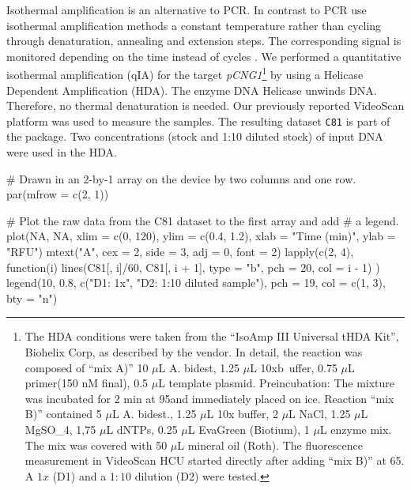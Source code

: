 Isothermal amplification is an alternative to PCR. In contrast to PCR use 
isothermal amplification methods a constant temperature rather than cycling 
through denaturation, annealing and extension steps. The corresponding signal is 
monitored depending on the time instead of cycles \citep{rodiger_nucleic_2014}. 
We performed a quantitative isothermal amplification (qIA) for the target 
\textit{pCNG1}\footnote{The HDA conditions were taken from the ``IsoAmp III 
Universal tHDA Kit'', Biohelix Corp, as described by the vendor. In detail, the 
reaction was composed of ``mix A)'' 10 $\mu$L A. bidest, 1.25 $\mu$L 10xb~uffer, 
0.75 $\mu$L primer(150 nM final), 0.5 $\mu$L template plasmid. Preincubation: 
The mixture was incubated for 2 min at 95\textcelsius and immediately placed on 
ice. Reaction ``mix B)'' contained 5 $\mu$L A. bidest., 1.25 $\mu$L 10x buffer, 
2 $\mu$L NaCl, 1.25 $\mu$L MgSO_{4}, 1,75 $\mu$L dNTPs, 0.25 $\mu$L EvaGreen 
(Biotium), 1 $\mu$L enzyme mix. The mix was covered with 50 $\mu$L mineral oil 
(Roth). The fluorescence measurement in VideoScan HCU started directly after 
adding ``mix B)'' at 65\textcelsius. A $1x$ (D1) and a $1:10$ dilution (D2) were 
tested.} by using a Helicase Dependent Amplification (HDA). The enzyme DNA 
Helicase unwinds DNA. Therefore, no thermal denaturation is needed. Our 
previously reported VideoScan platform \citep{rodiger_highly_2013} was used to 
measure the samples. The resulting dataset \texttt{C81} is part of the 
 package. Two concentrations (stock and 1:10 diluted stock) of 
input DNA were used in the HDA.

\begin{example}
# Drawn in an 2-by-1 array on the device by two columns and one row.
par(mfrow = c(2, 1))

# Plot the raw data from the C81 dataset to the first array and add
# a legend.
plot(NA, NA, xlim = c(0, 120), ylim = c(0.4, 1.2), xlab = "Time (min)", ylab = 
"RFU")
mtext("A", cex = 2, side = 3, adj = 0, font = 2)
lapply(c(2, 4), function(i) {
    lines(C81[, i]/60, C81[, i + 1], type = "b", pch = 20, col = i - 1)
})
legend(10, 0.8, c("D1: 1x", "D2: 1:10 diluted sample"), pch = 19, col = c(1, 
3), 
    bty = "n")
\end{example}

